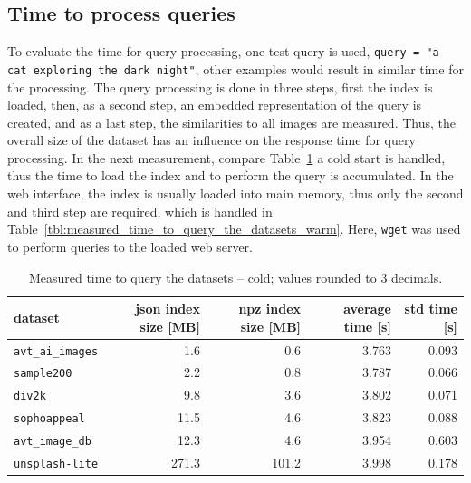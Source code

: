 \documentclass{article}
\begin{document}
\subsection{Time to process queries}
To evaluate the time for query processing, one test query is used, \texttt{query = "a cat exploring the dark night"}, other examples would result in similar time for the processing.
The query processing is done in three steps, first the index is loaded, then, as a second step, an embedded representation of the query is created, and as a last step, the similarities to all images are measured.
Thus, the overall size of the dataset has an influence on the response time for query processing.
In the next measurement, compare Table~\ref{tbl:measured_time_to_query_the_datasets_cold} a cold start is handled, thus the time to load the index and to perform the query is accumulated.
In the web interface, the index is usually loaded into main memory, thus only the second and third step are required, which is handled in Table~\ref{tbl:measured_time_to_query_the_datasets_warm}.
Here, \texttt{wget} was used to perform queries to the loaded web server.

\begin{table}[htb!]
\centering
\caption{Measured time to query the datasets -- cold; values rounded to 3 decimals.}
\label{tbl:measured_time_to_query_the_datasets_cold}
\begin{tabular}{lrrrr}
\toprule
dataset                  & json index size [MB] & npz index size [MB] & average time [s] & std time [s]  \\
\midrule
\texttt{avt\_ai\_images} & 1.6                  & 0.6                 & 3.763            & 0.093 \\
\texttt{sample200}       & 2.2                  & 0.8                 & 3.787            & 0.066 \\
\texttt{div2k}           & 9.8                  & 3.6                 & 3.802            & 0.071 \\
\texttt{sophoappeal}     & 11.5                 & 4.6                 & 3.823            & 0.088 \\
\texttt{avt\_image\_db}  & 12.3                 & 4.6                 & 3.954            & 0.603 \\
\texttt{unsplash-lite}   & 271.3                & 101.2               & 3.998            & 0.178 \\
\bottomrule
\end{tabular}
\end{table}
\end{document}
